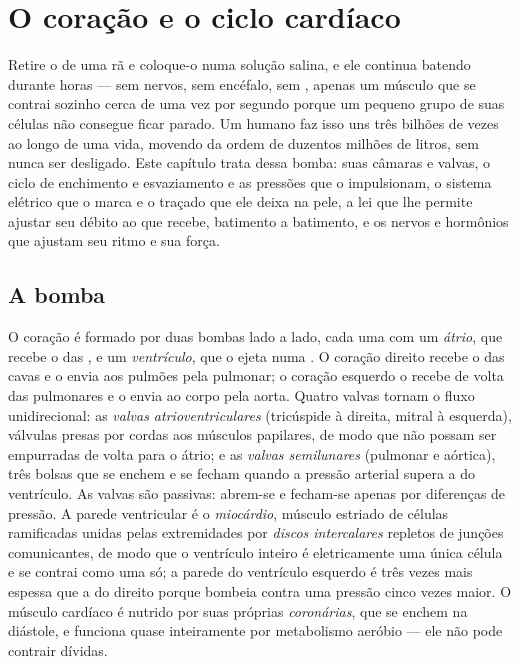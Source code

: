\chapter{O coração e o ciclo cardíaco}\label{ch:b2:heart}

Retire o  de uma rã e coloque-o numa solução salina, e ele
continua batendo durante horas --- sem nervos, sem encéfalo, sem ,
apenas um músculo que se contrai sozinho cerca de uma vez por segundo
porque um pequeno grupo de suas células não consegue ficar parado. Um
 humano faz isso uns três bilhões de vezes ao longo de uma vida,
movendo da ordem de duzentos milhões de litros, sem nunca ser
desligado. Este capítulo trata dessa bomba: suas câmaras e valvas, o
ciclo de enchimento e esvaziamento e as pressões que o impulsionam, o
sistema elétrico que o marca e o traçado que ele deixa na pele, a lei
que lhe permite ajustar seu débito ao que recebe, batimento a
batimento, e os nervos e hormônios que ajustam seu ritmo e sua força.

\section{A bomba}

\begin{definition}\label{def:b2:heart:anatomy}
O coração é formado por duas bombas lado a lado, cada uma com um
\emph{átrio}, que recebe o  das , e um \emph{ventrículo},
que o ejeta numa . O coração direito recebe o  das 
cavas e o envia aos pulmões pela  pulmonar; o coração esquerdo o
recebe de volta das  pulmonares e o envia ao corpo pela aorta.
Quatro valvas tornam o fluxo unidirecional: as \emph{valvas
atrioventriculares} (tricúspide à direita, mitral à esquerda),
válvulas presas por cordas aos músculos papilares, de modo que não
possam ser empurradas de volta para o átrio; e as \emph{valvas
semilunares} (pulmonar e aórtica), três bolsas que se enchem e se
fecham quando a pressão arterial supera a do ventrículo. As valvas são
passivas: abrem-se e fecham-se apenas por diferenças de pressão. A
parede ventricular é o \emph{miocárdio}, músculo estriado de células
ramificadas unidas pelas extremidades por \emph{discos intercalares}
repletos de junções comunicantes, de modo que o ventrículo inteiro é
eletricamente uma única célula e se contrai como uma só; a parede do
ventrículo esquerdo é três vezes mais espessa que a do direito porque
bombeia contra uma pressão cinco vezes maior. O músculo cardíaco é
nutrido por suas próprias \emph{ coronárias}, que se enchem na
diástole, e funciona quase inteiramente por metabolismo aeróbio --- ele
não pode contrair dívidas.
\end{definition}

